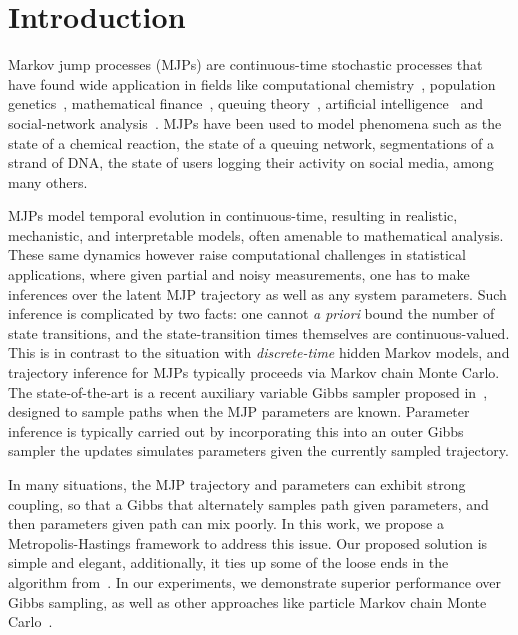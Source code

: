 \section{Introduction}
\label{sec:intro}
Markov jump processes (MJPs) are continuous-time stochastic processes that
have found wide application in fields like computational chemistry~\cite{gillespie97}, 
population genetics~\cite{FearnSher2006}, mathematical finance~\cite{Elliott06}, 
queuing theory~\cite{Breuer2003}, artificial intelligence~\cite{XuShe10} and
social-network analysis~\cite{pan2016markov}. %
MJPs have been used to model phenomena such as the state of a chemical reaction, the state 
of a queuing network, segmentations of a strand of DNA, the state of users 
logging their activity on social media, among many others.

MJPs model temporal evolution in continuous-time, resulting in 
realistic, mechanistic, and interpretable models, often amenable to 
mathematical analysis. These same dynamics however raise computational
challenges in statistical applications, where given partial and noisy 
measurements, one has to make inferences over the latent MJP 
trajectory as well as any system parameters. Such
inference is complicated by two facts: one cannot {\em a priori} 
bound the number of state transitions, and the state-transition times themselves
are continuous-valued. This is in contrast to the situation with
{\em discrete-time} hidden Markov models, and trajectory inference for 
MJPs typically proceeds via Markov chain Monte Carlo. The 
state-of-the-art is a recent auxiliary variable Gibbs sampler proposed 
in~\cite{RaoTeh13},  designed to sample paths when the MJP parameters
are known. Parameter inference is typically carried out by 
incorporating this into an outer Gibbs sampler the updates simulates
parameters given the currently sampled trajectory. 

In many situations, the MJP trajectory and parameters can exhibit 
strong coupling, so that a Gibbs that alternately samples path given
parameters, and then parameters given path can mix poorly.  
In this work, we propose a Metropolis-Hastings framework to address
this issue. Our proposed solution is simple and elegant, additionally,
it ties up some of the loose ends in the algorithm 
from~\cite{RaoTeh13}.  In our experiments, we demonstrate superior 
performance over Gibbs sampling, as well as other approaches like 
particle Markov chain Monte Carlo~\cite{Andrieu10}.

